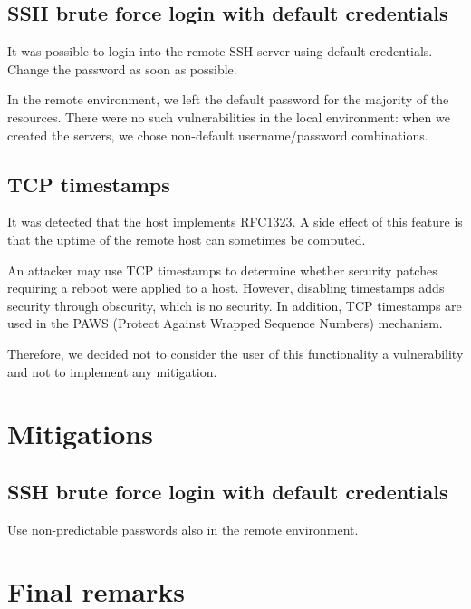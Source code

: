 \documentclass[draft]{homework}
\begin{document}
    \subsection{SSH brute force login with default credentials}
    \begin{displayquote}
        It was possible to login into the remote SSH server using default credentials.
       \textelp{}
       Change the password as soon as possible.
    \end{displayquote}
    In the remote environment, we left the default password for the majority of the resources.
    There were no such vulnerabilities in the local environment: when we created the servers, we chose non-default username/password combinations.
    
    \subsection{TCP timestamps}
    \begin{displayquote}
        It was detected that the host implements RFC1323.
        \textelp{}
        A side effect of this feature is that the uptime of the remote host can sometimes be computed.
    \end{displayquote}
    
    An attacker may use TCP timestamps to determine whether security patches requiring a reboot were applied to a host.
    However, disabling timestamps adds security through obscurity, which is no security. 
    In addition, TCP timestamps are used in the PAWS (Protect Against Wrapped Sequence Numbers) mechanism.
    
    Therefore, we decided not to consider the user of this functionality a vulnerability and not to implement any mitigation.
    
    
    
    \section{Mitigations}
    \subsection{SSH brute force login with default credentials}
    Use non-predictable passwords also in the remote environment.
    
    
    
    \section{Final remarks}
\end{document}

